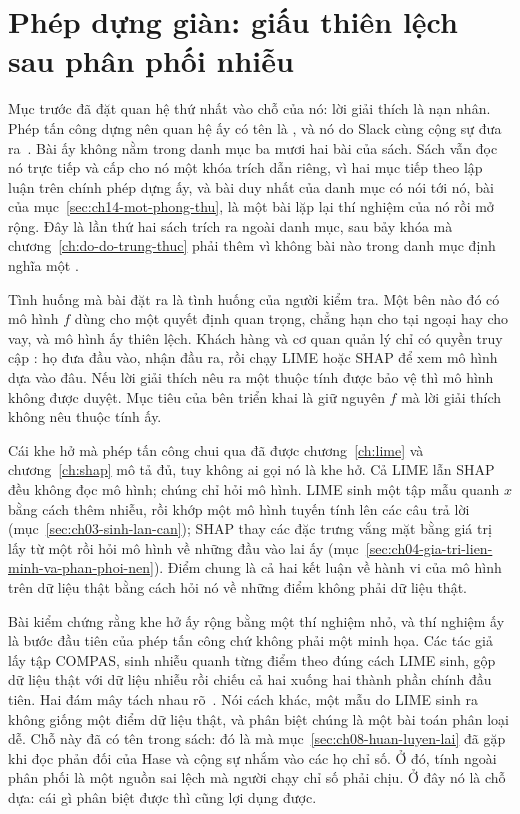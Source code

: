 \section{Phép dựng giàn: giấu thiên lệch sau phân phối nhiễu}
\label{sec:ch14-phep-dung-gian}

%
Mục trước đã đặt quan hệ thứ nhất vào chỗ của nó: lời giải thích là nạn nhân.
Phép tấn công dựng nên quan hệ ấy có tên là ,
và nó do Slack cùng cộng sự đưa ra~\autocite{mfooling}. Bài ấy không nằm trong
danh mục ba mươi hai bài của sách. Sách vẫn đọc nó trực tiếp và cấp cho nó một
khóa trích dẫn riêng, vì hai mục tiếp theo lập luận trên chính phép dựng ấy, và
bài duy nhất của danh mục có nói tới nó, bài của
mục~\ref{sec:ch14-mot-phong-thu}, là một bài lặp lại thí nghiệm của nó rồi mở
rộng. Đây là lần thứ hai sách trích ra ngoài danh mục, sau bảy khóa mà
chương~\ref{ch:do-do-trung-thuc} phải thêm vì không bài nào trong danh mục định
nghĩa một .

%
Tình huống mà bài đặt ra là tình huống của người kiểm tra. Một bên nào đó có mô
hình $f$ dùng cho một quyết định quan trọng, chẳng hạn cho tại ngoại hay cho
vay, và mô hình ấy thiên lệch. Khách hàng và cơ quan quản lý chỉ có quyền truy
cập : họ đưa đầu vào, nhận đầu ra, rồi chạy LIME hoặc
SHAP để xem mô hình dựa vào đâu. Nếu lời giải thích nêu ra một thuộc tính được
bảo vệ thì mô hình không được duyệt. Mục tiêu của bên triển khai là giữ nguyên
$f$ mà lời giải thích không nêu thuộc tính ấy.

Cái khe hở mà phép tấn công chui qua đã được chương~\ref{ch:lime} và
chương~\ref{ch:shap} mô tả đủ, tuy không ai gọi nó là khe hở. Cả LIME lẫn SHAP
đều không đọc mô hình; chúng chỉ hỏi mô hình. LIME sinh một tập mẫu quanh $x$
bằng cách thêm nhiễu, rồi khớp một mô hình tuyến tính lên các câu trả lời
(mục~\ref{sec:ch03-sinh-lan-can}); SHAP thay các đặc trưng vắng mặt bằng giá
trị lấy từ một
 rồi hỏi mô hình về những đầu vào lai
ấy (mục~\ref{sec:ch04-gia-tri-lien-minh-va-phan-phoi-nen}). Điểm chung là cả
hai kết luận về hành vi của mô hình trên dữ liệu thật bằng cách hỏi nó về những
điểm không phải dữ liệu thật.

%
Bài kiểm chứng rằng khe hở ấy rộng bằng một thí nghiệm nhỏ, và thí nghiệm ấy là
bước đầu tiên của phép tấn công chứ không phải một minh họa. Các tác giả lấy
tập COMPAS, sinh nhiễu quanh từng điểm theo đúng cách LIME sinh, gộp dữ liệu
thật với dữ liệu nhiễu rồi chiếu cả hai xuống hai thành phần chính đầu tiên.
Hai đám mây tách nhau rõ~\autocite{mfooling}. Nói cách khác, một mẫu do LIME
sinh ra không giống một điểm dữ liệu thật, và phân biệt chúng là một bài toán
phân loại dễ. Chỗ này đã có tên trong sách: đó là  mà mục~\ref{sec:ch08-huan-luyen-lai} đã gặp
khi đọc phản đối của Hase và cộng sự nhắm vào các họ chỉ số. Ở đó, tính ngoài
phân phối là một nguồn sai lệch mà người chạy chỉ số phải chịu. Ở đây nó là chỗ
dựa: cái gì phân biệt được thì cũng lợi dụng được.


